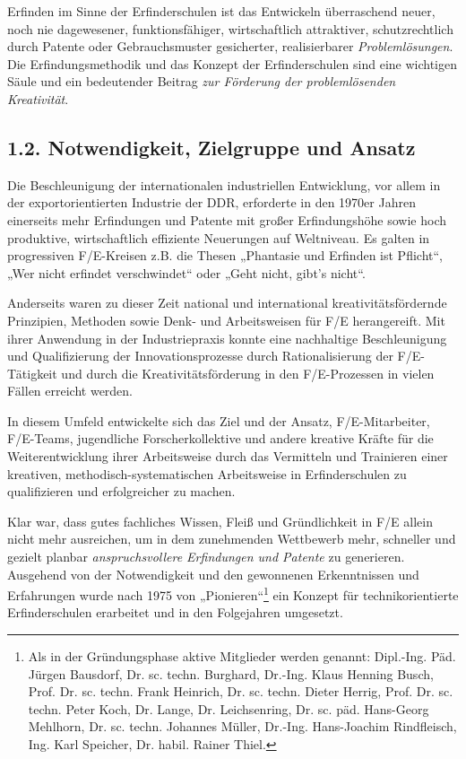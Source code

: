\documentclass[11pt,a4paper]{article}
\begin{document}
Erfinden im Sinne der Erfinderschulen ist das Entwickeln überraschend neuer,
noch nie dagewesener, funktionsfähiger, wirtschaftlich attraktiver,
schutzrechtlich durch Patente oder Gebrauchsmuster gesicherter, realisierbarer
\emph{Problemlösungen}. Die Erfindungsmethodik und das Konzept der
Erfinderschulen sind eine wichtigen Säule und ein bedeutender Beitrag
\emph{zur Förderung der problemlösenden Kreativität}.

\subsection*{1.2. Notwendigkeit, Zielgruppe und Ansatz}
Die Beschleunigung der internationalen industriellen Entwicklung, vor allem in
der exportorientierten Industrie der DDR, erforderte in den 1970er Jahren
einerseits mehr Erfindungen und Patente mit großer Erfindungshöhe sowie hoch
produktive, wirtschaftlich effiziente Neuerungen auf Weltniveau. Es galten in
progressiven F/E-Kreisen z.B. die Thesen „Phantasie und Erfinden ist Pflicht“,
„Wer nicht erfindet verschwindet“ oder „Geht nicht, gibt’s nicht“.

Anderseits waren zu dieser Zeit national und international
kreativitätsfördernde Prinzipien, Methoden sowie Denk- und Arbeitsweisen für
F/E herangereift. Mit ihrer Anwendung in der Industriepraxis konnte eine
nachhaltige Beschleunigung und Qualifizierung der Innovationsprozesse durch
Rationalisierung der F/E-Tätigkeit und durch die Kreativitätsförderung in den
F/E-Prozessen in vielen Fällen erreicht werden.

In diesem Umfeld entwickelte sich das Ziel und der Ansatz, F/E-Mitarbeiter,
F/E-Teams, jugendliche Forscherkollektive und andere kreative Kräfte für die
Weiterentwicklung ihrer Arbeitsweise durch das Vermitteln und Trainieren einer
kreativen, methodisch-systematischen Arbeitsweise in Erfinderschulen zu
qualifizieren und erfolgreicher zu machen.

Klar war, dass gutes fachliches Wissen, Fleiß und Gründlichkeit in F/E allein
nicht mehr ausreichen, um in dem zunehmenden Wettbewerb mehr, schneller und
gezielt planbar \emph{anspruchsvollere Erfindungen und Patente} zu generieren.
Ausgehend von der Notwendigkeit und den gewonnenen Erkenntnissen und
Erfahrungen wurde nach 1975 von „Pionieren“\footnote{Als in der Gründungsphase
aktive Mitglieder werden genannt: Dipl.-Ing. Päd. Jürgen Bausdorf,
Dr. sc. techn. Burghard, Dr.-Ing. Klaus Henning Busch,
Prof. Dr. sc. techn. Frank Heinrich, Dr. sc. techn. Dieter Herrig,
Prof. Dr. sc. techn. Peter Koch, Dr. Lange, Dr. Leichsenring,
Dr. sc. päd. Hans-Georg Mehlhorn, Dr. sc. techn. Johannes Müller,
Dr.-Ing. Hans-Joachim Rindfleisch, Ing. Karl Speicher, Dr. habil. Rainer
Thiel.} ein Konzept für technikorientierte Erfinderschulen erarbeitet und in
den Folgejahren umgesetzt.
\end{document}
